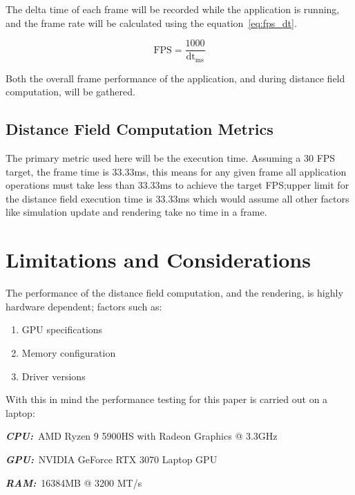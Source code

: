 The delta time of each frame will be recorded while the application is running, and the frame rate will be calculated
using the equation~\ref{eq:fps_dt}.

\begin{equation}\label{eq:fps_dt}
    \text{FPS} = \frac{1000}{\text{dt}_{\text{ms}}}
\end{equation}

Both the overall frame performance of the application, and during distance field computation, will be gathered.

\subsection{Distance Field Computation Metrics}\label{sec:distance_field_metrics}
The primary metric used here will be the execution time. Assuming a 30 FPS target, the frame time is 33.33ms, this means
for any given frame all application operations must take less than 33.33ms to achieve the target FPS;\@the upper
limit for the distance field execution time is 33.33ms which would assume all other factors like simulation update and
rendering take no time in a frame.

\section{Limitations and Considerations}
The performance of the distance field computation, and the rendering, is highly hardware dependent; factors such as:

\begin{enumerate}
    \item GPU specifications
    \item Memory configuration
    \item Driver versions
\end{enumerate}

With this in mind the performance testing for this paper is carried out on a laptop:

\begin{description}
    \item \textbf{\textit{CPU:}}~AMD Ryzen 9 5900HS with Radeon Graphics @ 3.3GHz
    \item \textbf{\textit{GPU:}}~NVIDIA GeForce RTX 3070 Laptop GPU
    \item \textbf{\textit{RAM:}}~16384MB @ 3200 MT/s
\end{description}
